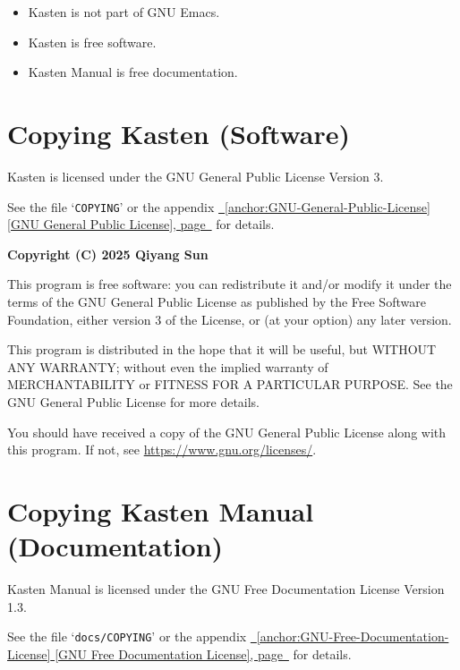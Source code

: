 \documentclass{book}
\renewcommand{\_}{\Texinfounderscore\discretionary{}{}{}}
\begin{document}
\begin{itemize}
\item Kasten is not part of GNU Emacs.
\item Kasten is free software.
\item Kasten Manual is free documentation.
\end{itemize}


\section{{Copying Kasten (Software)}}
\label{anchor:Copying-Kasten-_0028Software_0029}%

Kasten is licensed under the GNU General Public License Version 3.

See the file `\texttt{COPYING}' or the appendix \hyperref[anchor:GNU-General-Public-License]{\chaptername~\ref*{anchor:GNU-General-Public-License} [GNU General Public License], page~\pageref*{anchor:GNU-General-Public-License}} for details.

\textbf{Copyright (C) 2025 Qiyang Sun}

This program is free software: you can redistribute it and/or modify it under
the terms of the GNU General Public License as published by the Free Software
Foundation, either version 3 of the License, or (at your option) any later
version.

This program is distributed in the hope that it will be useful, but WITHOUT ANY
WARRANTY; without even the implied warranty of MERCHANTABILITY or FITNESS FOR A
PARTICULAR PURPOSE\@. See the GNU General Public License for more details.

You should have received a copy of the GNU General Public License along with
this program. If not, see \url{https://www.gnu.org/licenses/}.

\section{{Copying Kasten Manual (Documentation)}}
\label{anchor:Copying-Kasten-Manual-_0028Documentation_0029}%

Kasten Manual is licensed under the GNU Free Documentation License Version 1.3.

See the file `\texttt{docs/COPYING}' or the appendix \hyperref[anchor:GNU-Free-Documentation-License]{\chaptername~\ref*{anchor:GNU-Free-Documentation-License} [GNU Free Documentation License], page~\pageref*{anchor:GNU-Free-Documentation-License}} for
details.
\end{document}
